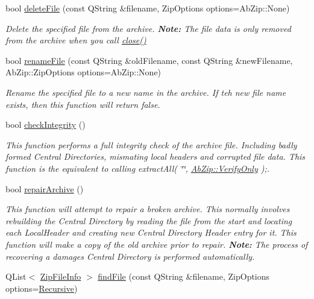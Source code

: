 \begin{DoxyCompactItemize}
bool \hyperlink{class_ab_zip_aba2e10727c9b7267e384e4e26ba63cbc}{delete\+File} (const Q\+String \&filename, Zip\+Options options=Ab\+Zip\+::\+None)
\begin{DoxyCompactList}\small\item\em Delete the specified file from the archive. {\bfseries Note\+:} The file data is only removed from the archive when you call \hyperlink{class_ab_zip_a8a68479ea9a9b4ba18064eb4f011af83}{close()} \end{DoxyCompactList}\item 
bool \hyperlink{class_ab_zip_a6e40593befbfd07151bfd89ee1fbc731}{rename\+File} (const Q\+String \&old\+Filename, const Q\+String \&new\+Filename, Ab\+Zip\+::\+Zip\+Options options=Ab\+Zip\+::\+None)
\begin{DoxyCompactList}\small\item\em Rename the specified file to a new name in the archive. If teh new file name exists, then this function will return {\ttfamily false}. \end{DoxyCompactList}\item 
bool \hyperlink{class_ab_zip_a783167f4c5f87551d7e2dc54b2beea3f}{check\+Integrity} ()
\begin{DoxyCompactList}\small\item\em This function performs a full integrity check of the archive file. Including badly formed Central Directories, mismating local headers and corrupted file data. This function is the equivalent to calling extract\+All( \char`\"{}\char`\"{}, \hyperlink{class_ab_zip_a9c4f57d6b8d9a449c2eb6c4d4e53c9d5aecc21ef1487642e3109d04d1a195010a}{Ab\+Zip\+::\+Verify\+Only} );. \end{DoxyCompactList}\item 
bool \hyperlink{class_ab_zip_aa61a973112ca3ba98185839d818ca77c}{repair\+Archive} ()
\begin{DoxyCompactList}\small\item\em This function will attempt to repair a broken archive. This normally involves rebuilding the Central Directory by reading the file from the start and locating each Local\+Header and creating new Central Directory Header entry for it. This function will make a copy of the old archive prior to repair. {\bfseries Note\+:} The process of recovering a damages Central Directory is performed automatically. \end{DoxyCompactList}\item 
Q\+List$<$ \hyperlink{class_zip_file_info}{Zip\+File\+Info} $>$ \hyperlink{class_ab_zip_a0ac7b0fe63df09a394d7c3bdb5568c1b}{find\+File} (const Q\+String \&filename, Zip\+Options options=\hyperlink{class_ab_zip_a9c4f57d6b8d9a449c2eb6c4d4e53c9d5a23555db8b40ecaf3966a205023b515e3}{Recursive})

\end{DoxyCompactItemize}
